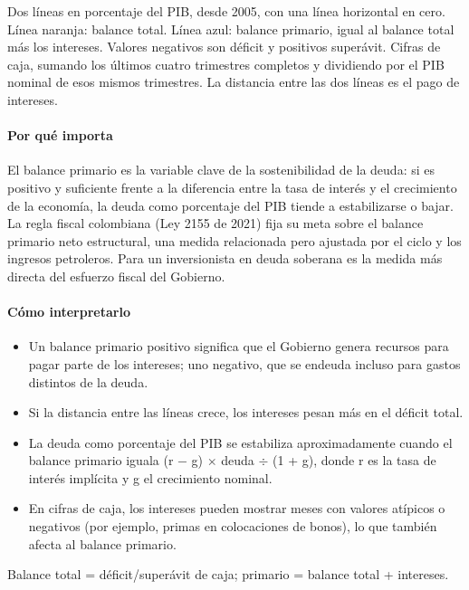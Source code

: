 \begin{leer}
Dos líneas en porcentaje del PIB, desde 2005, con una línea horizontal en cero. Línea naranja: balance total. Línea azul: balance primario, igual al balance total más los intereses. Valores negativos son déficit y positivos superávit. Cifras de caja, sumando los últimos cuatro trimestres completos y dividiendo por el PIB nominal de esos mismos trimestres. La distancia entre las dos líneas es el pago de intereses.
\end{leer}

\paragraph{Por qué importa}
El balance primario es la variable clave de la sostenibilidad de la deuda: si es positivo y suficiente frente a la diferencia entre la tasa de interés y el crecimiento de la economía, la deuda como porcentaje del PIB tiende a estabilizarse o bajar. La regla fiscal colombiana (Ley 2155 de 2021) fija su meta sobre el balance primario neto estructural, una medida relacionada pero ajustada por el ciclo y los ingresos petroleros. Para un inversionista en deuda soberana es la medida más directa del esfuerzo fiscal del Gobierno.

\paragraph{Cómo interpretarlo}
\begin{itemize}
\item Un balance primario positivo significa que el Gobierno genera recursos para pagar parte de los intereses; uno negativo, que se endeuda incluso para gastos distintos de la deuda.
\item Si la distancia entre las líneas crece, los intereses pesan más en el déficit total.
\item La deuda como porcentaje del PIB se estabiliza aproximadamente cuando el balance primario iguala (r − g) $\times$ deuda $\div$ (1 + g), donde r es la tasa de interés implícita y g el crecimiento nominal.
\item En cifras de caja, los intereses pueden mostrar meses con valores atípicos o negativos (por ejemplo, primas en colocaciones de bonos), lo que también afecta al balance primario.
\end{itemize}
\begin{formulas}[Fórmulas]
\end{formulas}
\begin{metodo}[Metodología]
Balance total = déficit/superávit de caja; primario = balance total + intereses.
\par{}
\end{metodo}

